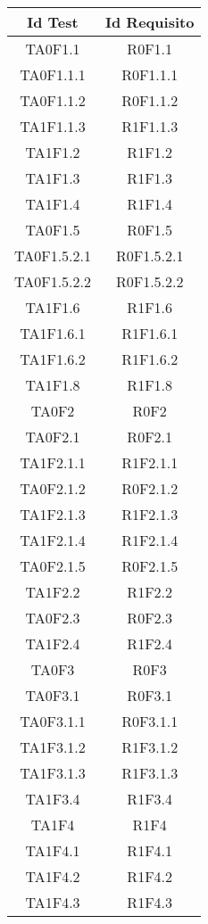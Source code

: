 	\begin{longtable}{|c|c|}
		\hline
		\textbf{Id Test} & \textbf{Id Requisito}\\
		\hline
		\endhead
		TA0F1.1&R0F1.1 \\ \hline
		TA0F1.1.1&R0F1.1.1 \\ \hline
		TA0F1.1.2&R0F1.1.2 \\ \hline
		TA1F1.1.3&R1F1.1.3 \\ \hline
		TA1F1.2&R1F1.2 \\ \hline
		TA1F1.3&R1F1.3 \\ \hline
		TA1F1.4&R1F1.4 \\ \hline
		TA0F1.5&R0F1.5 \\ \hline
		TA0F1.5.2.1&R0F1.5.2.1 \\ \hline
		TA0F1.5.2.2&R0F1.5.2.2 \\ \hline
		TA1F1.6&R1F1.6 \\ \hline
		TA1F1.6.1&R1F1.6.1 \\ \hline
		TA1F1.6.2&R1F1.6.2 \\ \hline
		TA1F1.8&R1F1.8 \\ \hline
		TA0F2&R0F2 \\ \hline
		TA0F2.1&R0F2.1 \\ \hline
		TA1F2.1.1&R1F2.1.1 \\ \hline
		TA0F2.1.2&R0F2.1.2 \\ \hline
		TA1F2.1.3&R1F2.1.3 \\ \hline
		TA1F2.1.4&R1F2.1.4 \\ \hline
		TA0F2.1.5&R0F2.1.5 \\ \hline
		TA1F2.2&R1F2.2 \\ \hline
		TA0F2.3&R0F2.3 \\ \hline
		TA1F2.4&R1F2.4 \\ \hline
		TA0F3&R0F3 \\ \hline
		TA0F3.1&R0F3.1 \\ \hline
		TA0F3.1.1&R0F3.1.1 \\ \hline
		TA1F3.1.2&R1F3.1.2 \\ \hline
		TA1F3.1.3&R1F3.1.3 \\ \hline
		TA1F3.4&R1F3.4 \\ \hline
		TA1F4&R1F4 \\ \hline
		TA1F4.1&R1F4.1 \\ \hline
		TA1F4.2&R1F4.2 \\ \hline
		TA1F4.3&R1F4.3 \\ \hline
	\end{longtable}

